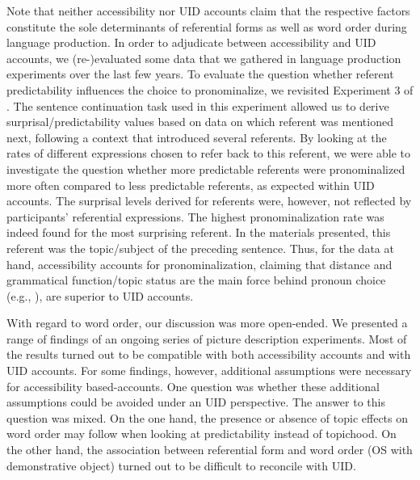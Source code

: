 \documentclass[output=paper,colorlinks,citecolor=brown]{langscibook}
\begin{document}
Note that neither accessibility nor UID accounts claim that the respective factors constitute the sole determinants of referential forms as well as word order during language production.
In order to adjudicate between accessibility and UID accounts, we (re-)evaluated some data that we gathered in language production experiments over the last few years. 
To evaluate the question whether referent predictability influences the choice to pronominalize, we revisited Experiment 3 of \citet{Bader::Portele-19-The-interpretation-of}. The sentence continuation task used in this experiment allowed us to derive surprisal/predictability values based on data on which referent was mentioned next, following a context that introduced several referents. By looking at the rates of different expressions chosen to refer back to this referent, we were able to investigate the question whether more predictable referents were pronominalized more often compared to less predictable referents, as expected within UID accounts. The surprisal levels derived for referents were, however, not reflected by participants' referential expressions. The highest pronominalization rate was indeed found for the most surprising referent. In the materials presented, this referent was the topic/subject of the preceding sentence. Thus, for the data at hand, accessibility accounts for pronominalization, claiming that distance and grammatical function/topic status are the main force behind pronoun choice (e.g., \citealt{Fukumura::van_Gompel-10, Rohde::Kehler-14}), are superior to UID accounts.  

With regard to word order, our discussion was more open-ended. We presented a range of findings of an ongoing series of picture description experiments. Most of the results turned out to be compatible with both accessibility accounts and with UID accounts. For some findings, however, additional assumptions were necessary for accessibility based-accounts. One question was whether these additional assumptions could be avoided under an UID perspective. The answer to this question was mixed. On the one hand, the presence or absence of topic effects on word order may follow when looking at predictability instead of topichood. On the other hand, the association between referential form and word order (OS with demonstrative object) turned out to be difficult to reconcile with UID.
\end{document}
